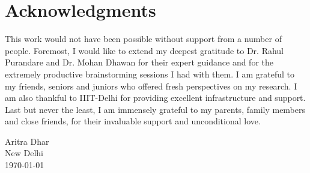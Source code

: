 \section*{Acknowledgments}
\label{section:acknowledgments}
\pagestyle{plain}


This work would not have been possible without support from a number of people.
Foremost, I would like to extend my deepest gratitude to Dr. Rahul Purandare and
Dr. Mohan Dhawan for their expert guidance and for the extremely productive
brainstorming sessions I had with them. I am grateful to my friends, seniors and
juniors who offered fresh perspectives on my research. I am also thankful to
IIIT-Delhi for providing excellent infrastructure and support. Last but never
the least, I am immensely grateful to my parents, family members and close
friends, for their invaluable support and unconditional love.\newline

Aritra Dhar\\
New Delhi\\
\today\\
